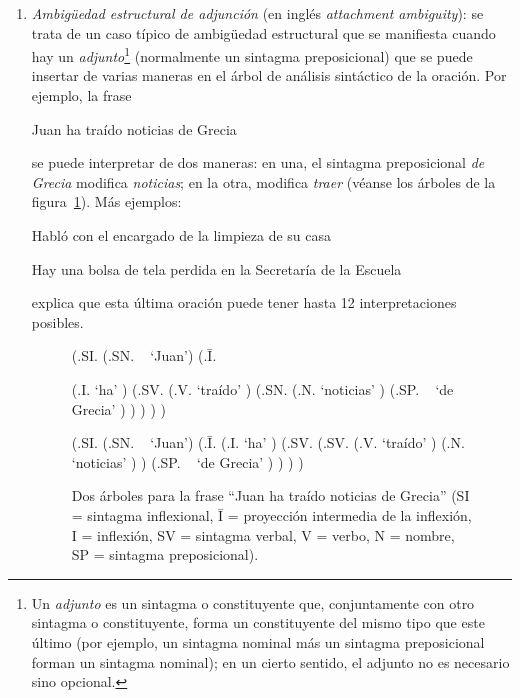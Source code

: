 \begin{enumerate}
\item \emph{Ambigüedad estructural de adjunción} (en inglés \emph{attachment ambiguity}): se trata de un caso típico de ambigüedad estructural que se manifiesta cuando hay un {\em adjunto}\footnote{Un \emph{adjunto} es un sintagma o constituyente que, conjuntamente con otro sintagma o constituyente, forma un constituyente del mismo tipo que este último (por ejemplo, un sintagma nominal más un sintagma preposicional forman un sintagma nominal); en un cierto sentido, el adjunto no es necesario sino opcional.} (normalmente un sintagma preposicional) que se puede insertar de varias maneras en el árbol de análisis sintáctico de la oración. Por ejemplo, la frase \begin{exemple} Juan ha traído noticias de Grecia \end{exemple} se puede interpretar de dos maneras: en una, el sintagma preposicional \emph{de Grecia} modifica \emph{noticias}; en la otra, modifica \emph{traer} (véanse los árboles de la figura~\ref{fg:noticies}). Más ejemplos: \begin{exemple} Habló con el encargado de la limpieza de su casa \end{exemple} \begin{exemple} Hay una bolsa de tela perdida en la Secretaría de la Escuela \label{ex:bossa} \end{exemple} \citet{tuson99b} explica que esta última oración puede tener hasta 12 interpretaciones posibles. 

\begin{figure} \begin{center} \begin{parsetree} (.SI. (.SN. ~ `Juan') (.{\={I}}. 

(.I. `ha' ) (.SV. (.V. `traído' ) (.SN. (.N. `noticias' ) (.SP. ~ `de Grecia' ) ) ) ) ) \end{parsetree} \end{center} \begin{center} \begin{parsetree} (.SI. (.SN. ~ `Juan') (.{\={I}}. (.I. `ha' ) (.SV. (.SV. (.V. `traído' ) (.N. `noticias' ) ) (.SP. ~ `de Grecia' ) ) ) ) \end{parsetree} \end{center} \caption{Dos árboles para la frase ``Juan ha traído noticias de Grecia'' (SI = sintagma inflexional, \={I =} proyección intermedia de la inflexión, I = inflexión, SV = sintagma verbal, V = verbo, N = nombre, SP = sintagma preposicional). } \label{fg:noticies} \end{figure} \end{enumerate} 

